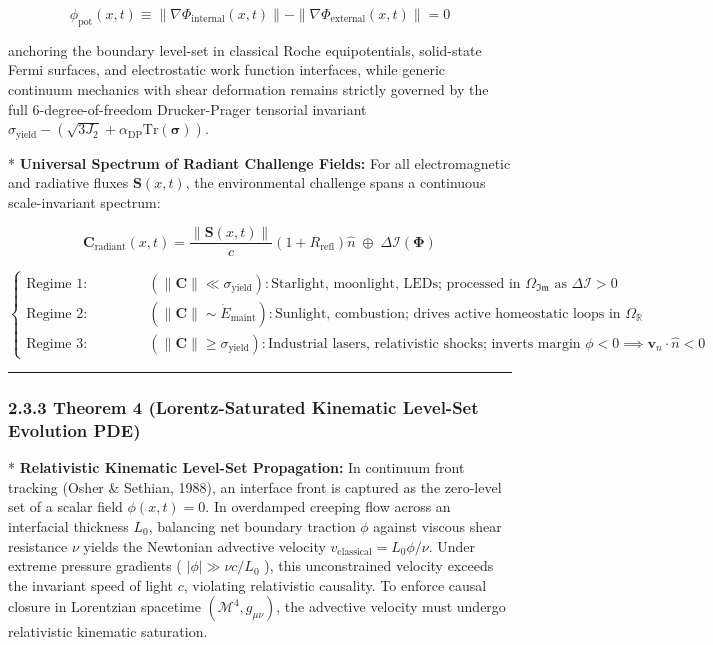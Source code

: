 \documentclass[11pt,a4paper]{article}
\theoremstyle{definition}\newtheorem{definition}{Definition}
\theoremstyle{remark}\newtheorem{remark}{Remark}
\begin{document}
\begin{equation}
\boxed{\phi_{\text{pot}}(x, t) \equiv \|\nabla \Phi_{\text{internal}}(x, t)\| - \|\nabla \Phi_{\text{external}}(x, t)\| = 0}
\end{equation}


anchoring the boundary level-set in classical Roche equipotentials, solid-state Fermi surfaces, and electrostatic work function interfaces, while generic continuum mechanics with shear deformation remains strictly governed by the full 6-degree-of-freedom Drucker-Prager tensorial invariant $\sigma_{\text{yield}} - (\sqrt{3 J_2} + \alpha_{\text{DP}}\mathrm{Tr}(\boldsymbol{\sigma}))$.

* \textbf{Universal Spectrum of Radiant Challenge Fields:}
For all electromagnetic and radiative fluxes $\mathbf{S}(x, t)$, the environmental challenge spans a continuous scale-invariant spectrum:


\begin{equation}
\mathbf{C}_{\text{radiant}}(x, t) = \frac{\|\mathbf{S}(x, t)\|}{c}(1 + R_{\text{refl}})\hat{n} \;\oplus\; \Delta \mathcal{I}(\mathbf{\Phi})
\end{equation}



\begin{equation}
\begin{cases}
\text{Regime 1: Informational Signal} & (\|\mathbf{C}\| \ll \sigma_{\text{yield}}): \text{Starlight, moonlight, LEDs; processed in } \Omega_{\mathfrak{Im}} \text{ as } \Delta \mathcal{I} > 0 \\
\text{Regime 2: Metabolic / Thermal} & (\|\mathbf{C}\| \sim \dot{E}_{\text{maint}}): \text{Sunlight, combustion; drives active homeostatic loops in } \Omega_{\mathbb{R}} \\
\text{Regime 3: Ablative / Fracture} & (\|\mathbf{C}\| \ge \sigma_{\text{yield}}): \text{Industrial lasers, relativistic shocks; inverts margin } \phi < 0 \implies \mathbf{v}_n \cdot \hat{n} < 0
\end{cases}
\end{equation}


\noindent\rule{\linewidth}{0.4pt}
\subsubsection{2.3.3 Theorem 4 (Lorentz-Saturated Kinematic Level-Set Evolution PDE)}

* \textbf{Relativistic Kinematic Level-Set Propagation:} In continuum front tracking (Osher \& Sethian, 1988), an interface front is captured as the zero-level set of a scalar field $\phi(x, t) = 0$. In overdamped creeping flow across an interfacial thickness $L_0$, balancing net boundary traction $\phi$ against viscous shear resistance $\nu$ yields the Newtonian advective velocity $v_{\text{classical}} = L_0 \phi / \nu$. Under extreme pressure gradients ( $|\phi| \gg \nu c / L_0$ ), this unconstrained velocity exceeds the invariant speed of light $c$, violating relativistic causality. To enforce causal closure in Lorentzian spacetime $(\mathcal{M}^4, g_{\mu\nu})$, the advective velocity must undergo relativistic kinematic saturation.
\end{document}
